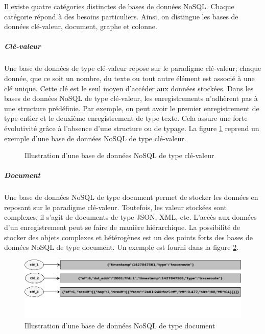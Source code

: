 	Il existe quatre catégories distinctes de bases de données NoSQL. Chaque catégorie répond  à des besoins particuliers. Ainsi, on distingue les bases de données clé-valeur, document, graphe et colonne.
	
	


	\subparagraph {Clé-valeur} Une base de données de type clé-valeur repose sur le paradigme clé-valeur; chaque donnée, que ce soit un nombre, du texte ou tout autre élément est associé à une clé unique. Cette clé est le seul moyen d'accéder aux données stockées.
	Dans les bases de données NoSQL de type clé-valeur, les enregistrements  n'adhèrent pas à une structure prédéfinie. Par exemple, on peut avoir le premier enregistrement de type entier et le deuxième enregistrement de type texte. Cela assure une forte évolutivité grâce à l'absence d'une structure ou de typage. La figure \ref{fig:key-value-nosql} reprend un exemple d'une base de données NoSQL de type clé-valeur.

	
	\begin{figure}[H]
		\captionsetup{justification=centering}
		\centering
		\resizebox{!}{!}{
			
	    }
		\caption{Illustration d'une base de données NoSQL de type clé-valeur}
		\label{fig:key-value-nosql}
	\end{figure}
	

		\subparagraph{Document} Une base de données NoSQL de type document permet de stocker les données en reposant sur le paradigme clé-valeur. Toutefois, les valeur stockées sont complexes, il s'agit de documents de type JSON, XML, etc. L'accès aux données d'un enregistrement peut se faire de manière hiérarchique. La possibilité de stocker des objets complexes et hétérogènes  est un des points forts des bases de données NoSQL de type  document. Un exemple est fourni dans la figure \ref{fig:document-nosql}.
		
		\begin{figure}[H]
			\centering
			\includegraphics[width=1\linewidth]{illustrations/document-nosql}
			\caption{Illustration d'une base de données NoSQL de type document}
			\label{fig:document-nosql}
		\end{figure}
	

